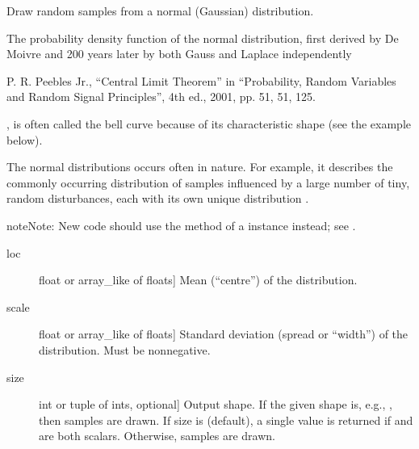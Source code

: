 \documentclass[letterpaper,10pt,english]{sphinxmanual}
\begin{document}

\begin{fulllineitems}
\label{\detokenize{time_warping:time_warping.normal}}
Draw random samples from a normal (Gaussian) distribution.

The probability density function of the normal distribution, first
derived by De Moivre and 200 years later by both Gauss and Laplace
independently %
\begin{footnote}[2]\sphinxAtStartFootnote
P. R. Peebles Jr., “Central Limit Theorem” in “Probability,
Random Variables and Random Signal Principles”, 4th ed., 2001,
pp. 51, 51, 125.
%
\end{footnote}, is often called the bell curve because of
its characteristic shape (see the example below).

The normal distributions occurs often in nature.  For example, it
describes the commonly occurring distribution of samples influenced
by a large number of tiny, random disturbances, each with its own
unique distribution \sphinxfootnotemark[2].

\begin{sphinxadmonition}{note}{Note:}
New code should use the  method of a 
instance instead; see .
\end{sphinxadmonition}
\begin{description}
\item[{loc}] \leavevmode{[}float or array\_like of floats{]}
Mean (“centre”) of the distribution.

\item[{scale}] \leavevmode{[}float or array\_like of floats{]}
Standard deviation (spread or “width”) of the distribution. Must be
non\sphinxhyphen{}negative.

\item[{size}] \leavevmode{[}int or tuple of ints, optional{]}
Output shape.  If the given shape is, e.g., , then
 samples are drawn.  If size is  (default),
a single value is returned if  and  are both scalars.
Otherwise,  samples are drawn.


\end{description}
\end{fulllineitems}
\end{document}
